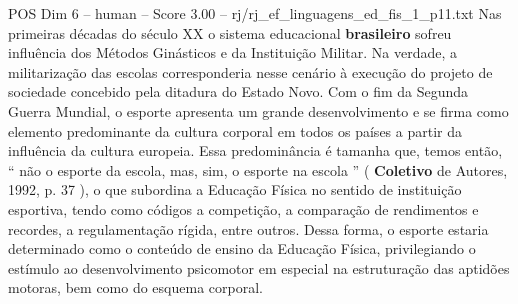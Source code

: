 \begin{textsample}{POS Dim 6 – human – Score 3.00 – rj/rj\_ef\_linguagens\_ed\_fis\_1\_p11.txt}  \label{ex:f6_pos_016}
Nas primeiras décadas do século XX o sistema educacional \textbf{brasileiro} sofreu influência dos Métodos Ginásticos e da Instituição Militar.
Na verdade, a militarização das escolas corresponderia nesse cenário à execução do projeto de sociedade concebido pela ditadura do Estado Novo.
Com o fim da Segunda Guerra Mundial, o esporte apresenta um grande desenvolvimento e se firma como elemento predominante da cultura corporal em todos os países a partir da influência da cultura europeia.
Essa predominância é tamanha que, temos então, “ não o esporte da escola, mas, sim, o esporte na escola ” ( \textbf{Coletivo} de Autores, 1992, p. 37 ), o que subordina a Educação Física no sentido de instituição esportiva, tendo como códigos a competição, a comparação de rendimentos e recordes, a regulamentação rígida, entre outros.
Dessa forma, o esporte estaria determinado como o conteúdo de ensino da Educação Física, privilegiando o estímulo ao desenvolvimento psicomotor em especial na estruturação das aptidões motoras, bem como do esquema corporal.

\end{textsample}
